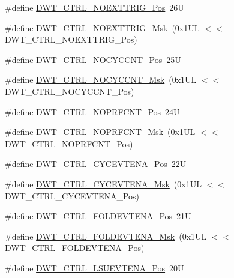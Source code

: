 \begin{DoxyCompactItemize}
\item 
\#define \mbox{\hyperlink{group___c_m_s_i_s___d_w_t_gad997b9026715d5609b5a3b144eca42d0}{D\+W\+T\+\_\+\+C\+T\+R\+L\+\_\+\+N\+O\+E\+X\+T\+T\+R\+I\+G\+\_\+\+Pos}}~26U
\item 
\#define \mbox{\hyperlink{group___c_m_s_i_s___d_w_t_gacc7d15edf7a27147c422099ab475953e}{D\+W\+T\+\_\+\+C\+T\+R\+L\+\_\+\+N\+O\+E\+X\+T\+T\+R\+I\+G\+\_\+\+Msk}}~(0x1\+U\+L $<$$<$ D\+W\+T\+\_\+\+C\+T\+R\+L\+\_\+\+N\+O\+E\+X\+T\+T\+R\+I\+G\+\_\+\+Pos)
\item 
\#define \mbox{\hyperlink{group___c_m_s_i_s___d_w_t_ga337f6167d960f57f12aa382ffecce522}{D\+W\+T\+\_\+\+C\+T\+R\+L\+\_\+\+N\+O\+C\+Y\+C\+C\+N\+T\+\_\+\+Pos}}~25U
\item 
\#define \mbox{\hyperlink{group___c_m_s_i_s___d_w_t_gaf40c8d7a4fd978034c137e90f714c143}{D\+W\+T\+\_\+\+C\+T\+R\+L\+\_\+\+N\+O\+C\+Y\+C\+C\+N\+T\+\_\+\+Msk}}~(0x1\+U\+L $<$$<$ D\+W\+T\+\_\+\+C\+T\+R\+L\+\_\+\+N\+O\+C\+Y\+C\+C\+N\+T\+\_\+\+Pos)
\item 
\#define \mbox{\hyperlink{group___c_m_s_i_s___d_w_t_gad52a0e5be84363ab166cc17beca0d048}{D\+W\+T\+\_\+\+C\+T\+R\+L\+\_\+\+N\+O\+P\+R\+F\+C\+N\+T\+\_\+\+Pos}}~24U
\item 
\#define \mbox{\hyperlink{group___c_m_s_i_s___d_w_t_gafd8448d7db4bc51f27f202e6e1f27823}{D\+W\+T\+\_\+\+C\+T\+R\+L\+\_\+\+N\+O\+P\+R\+F\+C\+N\+T\+\_\+\+Msk}}~(0x1\+U\+L $<$$<$ D\+W\+T\+\_\+\+C\+T\+R\+L\+\_\+\+N\+O\+P\+R\+F\+C\+N\+T\+\_\+\+Pos)
\item 
\#define \mbox{\hyperlink{group___c_m_s_i_s___d_w_t_ga0cb0640aaeb18a626d7823570d5c3cb6}{D\+W\+T\+\_\+\+C\+T\+R\+L\+\_\+\+C\+Y\+C\+E\+V\+T\+E\+N\+A\+\_\+\+Pos}}~22U
\item 
\#define \mbox{\hyperlink{group___c_m_s_i_s___d_w_t_ga40554bd81460e39abf08810f45fac1a2}{D\+W\+T\+\_\+\+C\+T\+R\+L\+\_\+\+C\+Y\+C\+E\+V\+T\+E\+N\+A\+\_\+\+Msk}}~(0x1\+U\+L $<$$<$ D\+W\+T\+\_\+\+C\+T\+R\+L\+\_\+\+C\+Y\+C\+E\+V\+T\+E\+N\+A\+\_\+\+Pos)
\item 
\#define \mbox{\hyperlink{group___c_m_s_i_s___d_w_t_ga5602b0707f446ce78d88ff2a3a82bfff}{D\+W\+T\+\_\+\+C\+T\+R\+L\+\_\+\+F\+O\+L\+D\+E\+V\+T\+E\+N\+A\+\_\+\+Pos}}~21U
\item 
\#define \mbox{\hyperlink{group___c_m_s_i_s___d_w_t_ga717e679d775562ae09185a3776b1582f}{D\+W\+T\+\_\+\+C\+T\+R\+L\+\_\+\+F\+O\+L\+D\+E\+V\+T\+E\+N\+A\+\_\+\+Msk}}~(0x1\+U\+L $<$$<$ D\+W\+T\+\_\+\+C\+T\+R\+L\+\_\+\+F\+O\+L\+D\+E\+V\+T\+E\+N\+A\+\_\+\+Pos)
\item 
\#define \mbox{\hyperlink{group___c_m_s_i_s___d_w_t_gaea5d1ee72188dc1d57b54c60a9f5233e}{D\+W\+T\+\_\+\+C\+T\+R\+L\+\_\+\+L\+S\+U\+E\+V\+T\+E\+N\+A\+\_\+\+Pos}}~20U
$$
\end{DoxyCompactItemize}
